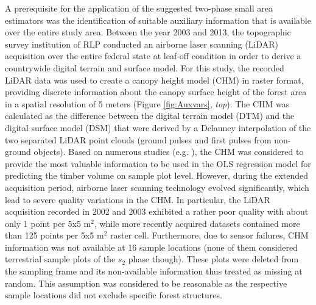 A prerequisite for the application of the suggested two-phase small area estimators was the identification of suitable auxiliary information that is available over the entire study area. Between the year 2003 and 2013, the topographic survey institution of RLP conducted an airborne laser scanning (LiDAR) acquisition over the entire federal state at leaf-off condition in order to derive a countrywide digital terrain and surface model. For this study, the recorded LiDAR data was used to create a canopy height model (CHM) in raster format, providing discrete information about the canopy surface height of the forest area in a spatial resolution of 5 meters (Figure \ref{fig:Auxvars}, \textit{top}). The CHM was calculated as the difference between the digital terrain model (DTM) and the digital surface model (DSM) that were derived by a Delauney interpolation of the two separated LiDAR point clouds (ground pulses and first pulses from non-ground objects). Based on numerous studies (e.g. \cite{maack2016}), the CHM was considered to provide the most valuable information to be used in the OLS regression model for predicting the timber volume on sample plot level. However, during the extended acquisition period, airborne laser scanning technology evolved significantly, which lead to severe quality variations in the CHM. In particular, the LiDAR acquisition recorded in 2002 and 2003 exhibited a rather poor quality with about only 1 point per 5x5 m$^2$, while more recently acquired datasets contained more than 125 points per 5x5 m$^2$ raster cell. Furthermore, due to sensor failures, CHM information was not available at 16 sample locations (none of them considered terrestrial sample plots of the $s_2$ phase though). These plots were deleted from the sampling frame and its non-available information thus treated as missing at random. This assumption was considered to be reasonable as the respective sample locations did not exclude specific forest structures.

